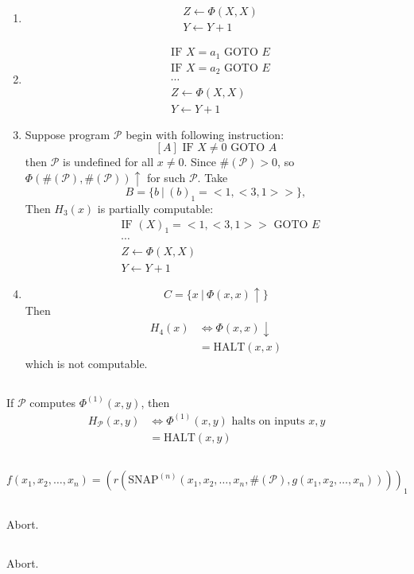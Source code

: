 \subsection{}
\begin{enumerate}
  \item 
  \begin{align*}
    & Z \gets \Phi(X,X) \\
    & Y \gets Y + 1
  \end{align*}
  
  \item 
  \begin{align*}
    & \text{IF } X = a_{1} \text{ GOTO } E \\
    & \text{IF } X = a_{2} \text{ GOTO } E \\
    & \cdots \\
    & Z \gets \Phi(X,X) \\
    & Y \gets Y + 1
  \end{align*}
  
  \item 
  Suppose program $\mathscr{P}$ begin with following instruction:
  \[ [A] \text{ IF } X \neq 0 \text{ GOTO } A \]
  then $\mathscr{P}$ is undefined for all $ x \neq 0 $. Since
  $ \#(\mathscr{P}) > 0 $, so $ \Phi(\#(\mathscr{P}), \#(\mathscr{P}))\uparrow $
  for such $\mathscr{P}$. Take
  \[ B = \{b \ |\ (b)_1 = <1,<3,1>> \} ,\]
  Then $ H_3(x) $ is partially computable:
  \begin{align*}
    & \text{IF } (X)_1 = <1,<3,1>> \text{ GOTO } E \\
    & \cdots \\
    & Z \gets \Phi(X,X) \\
    & Y \gets Y + 1
  \end{align*}
  
  \item 
  \[ C = \{ x\ |\ \Phi(x,x)\uparrow \} \]
  Then
  \[ \begin{split}
    H_4(x) & \Leftrightarrow \Phi(x,x)\downarrow \\
           & = \mathrm{HALT}(x,x)
  \end{split} \]
  which is not computable.
\end{enumerate}


\subsection{}
If $\mathscr{P}$ computes $\Phi^{(1)}(x,y) $, then
\[\begin{split}
  H_{\mathscr{P}}(x,y) & \Leftrightarrow \Phi^{(1)}(x,y) \text{ halts on inputs } x,y \\
                       & = \mathrm{HALT}(x,y)
\end{split}\]


\subsection{}
\[ f(x_1,x_2,\dots,x_n) = 
   (r(\mathrm{SNAP}^{(n)}(x_1,x_2,\dots,x_n,\#(\mathscr{P}),g(x_1,x_2,\dots,x_n))))_1 \]


\subsection{}
Abort.

\subsection{}
Abort.